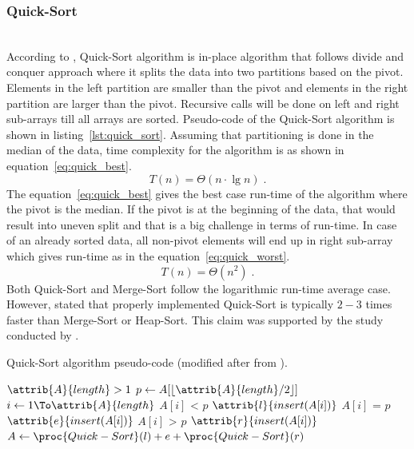 \documentclass[sigconf, nonacm, natbib, screen, balance=False]{acmart}
\newcommand{\floor}[1]{\left\lfloor #1 \right\rfloor}
\begin{document}
\subsubsection{Quick-Sort}\label{sec:quick_sort}
\hfill\\
According to \citet{CLRS_2009}, Quick-Sort algorithm is in-place algorithm that follows divide and conquer approach where it splits the data into two partitions based on the pivot. Elements in the left partition are smaller than the pivot and elements in the right partition are larger than the pivot. Recursive calls will be done on left and right sub-arrays till all arrays are sorted. Pseudo-code of the Quick-Sort algorithm is shown in listing~\ref{lst:quick_sort}. Assuming that partitioning is done in the median of the data, time complexity for the algorithm is as shown in equation~\ref{eq:quick_best}. 
\begin{equation}
  T(n) = \Theta(n\cdot\lg n) \;.  \label{eq:quick_best} 
\end{equation}
The equation~\ref{eq:quick_best} gives the best case run-time of the algorithm where the pivot is the median. If the pivot is at the beginning of the data, that would result into uneven split and that is a big challenge in terms of run-time. In case of an already sorted data, all non-pivot elements will end up in right sub-array which gives run-time as in the equation~\ref{eq:quick_worst}.
\begin{equation}
  T(n) = \Theta(n^2) \;.  \label{eq:quick_worst}
\end{equation}
Both Quick-Sort and Merge-Sort follow the logarithmic run-time average case. However, \citet{skienna08} stated that properly implemented Quick-Sort is typically $2-3$ times faster than Merge-Sort or Heap-Sort. This claim was supported by the study conducted by \citet{Rajput2012PerformanceCO}.

\begin{listing}
  \caption{Quick-Sort algorithm pseudo-code (modified after from \citet[Ch.~2.1]{CLRS_2009}).}
  \label{lst:quick_sort}
  \begin{codebox}
  \li \If $\attrib{A}{length} > 1$
  \li \Then
  $p \gets A[\floor{\attrib{A}{length}/2}]$
  \li \For $i \gets 1 \To \attrib{A}{length}$
  \li \Do
  \If $A[i]$ < $p$
  \li \Then
  $\attrib{l}{insert(A[i])}$
  \li \ElseIf
  $A[i]$ = $p$
  \li \Then
  $\attrib{e}{insert(A[i])}$
  \li \ElseIf
  $A[i]$ > $p$
  \li \Then
  $\attrib{r}{insert(A[i])}$
  \End
  \End
  \li $A \gets \proc{Quick-Sort}(l)+e+\proc{Quick-Sort}(r)$
  \End
  \end{codebox}
\end{listing}
\end{document}
